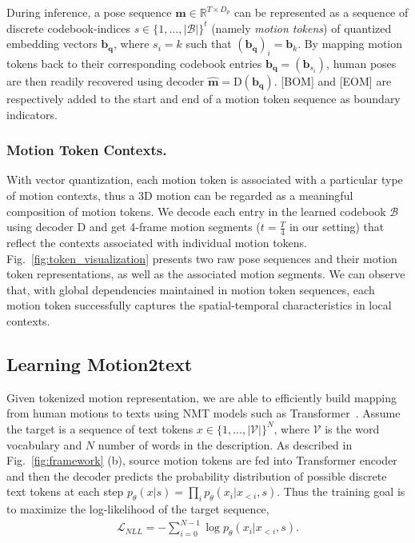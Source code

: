 \documentclass[runningheads]{llncs}
\newcommand{\beforesubsection}{\vspace{-2mm}}
\newcommand{\aftersubsection}{\vspace{-2mm}}
\newcommand{\beforesubsubsection}{\vspace{-5mm}}
\begin{document}
During inference, a pose sequence $\mathbf{m}\in \mathbb{R}^{T\times D_p}$ can be represented as a sequence of discrete codebook-indices $s\in\{1,...,|\mathscr{B}|\}^t$ (namely \textit{motion tokens}) of quantized embedding vectors $\mathbf{b}_{\mathbf{q}}$, where $s_i=k$ such that $(\mathbf{b}_\mathbf{q})_i = \mathbf{b}_k$. By mapping motion tokens back to their corresponding codebook entries $\mathbf{b}_\mathbf{q} = (\mathbf{b}_{s_i})$, human poses are then readily recovered using decoder $\mathbf{\hat{m}} = \mathrm{D}(\mathbf{b}_\mathbf{q})$. [BOM] and [EOM] are respectively added to the start and end of a motion token sequence as boundary indicators.

\beforesubsubsection
\subsubsection{Motion Token Contexts.} With vector quantization, each motion token is associated with a particular type of motion contexts, thus a 3D motion can be regarded as a meaningful composition of motion tokens. We decode each entry in the learned codebook $\mathscr{B}$ using decoder $\mathrm{D}$ and get 4-frame motion segments ($t=\frac{T}{4}$ in our setting) that reflect the contexts associated with individual motion tokens. Fig.~\ref{fig:token_visualization} presents two raw pose sequences and their motion token representations, as well as the associated motion segments. We can observe that, with global dependencies maintained in motion token sequences, each motion token successfully captures the spatial-temporal characteristics in local contexts. 

\beforesubsection
\subsection{Learning Motion2text}
\aftersubsection
\label{app: motion-to-text}
Given tokenized motion representation, we are able to efficiently build mapping from human motions to texts using NMT models such as Transformer~\cite{vaswani2017attention}. Assume the target is a sequence of text tokens $x\in\{1,...,|\mathscr{V}|\}^N$, where $\mathscr{V}$ is the word vocabulary and $N$ number of words in the description. As described in Fig.~\ref{fig:framework} (b), source motion tokens are fed into Transformer encoder and then the decoder predicts the probability distribution of possible discrete text tokens at each step $p_\theta(x|s)=\prod_i p_\theta(x_i|x_{<i}, s)$. Thus the training goal is to maximize the log-likelihood of the target sequence,
\begin{align}
    \mathcal{L}_{NLL} = -\sum_{i=0}^{N-1} \log p_\theta(x_i|x_{<i}, s).
\end{align}
\end{document}
